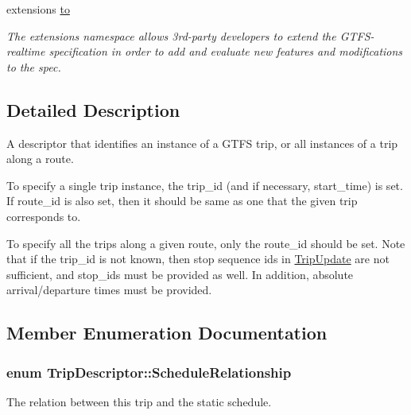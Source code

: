 \begin{DoxyCompactItemize}
\item 
extensions \hyperlink{structTripDescriptor_a1c2d7a6af17cb6ebf909b087bc2af535}{to}
\begin{DoxyCompactList}\small\item\em The extensions namespace allows 3rd-\/party developers to extend the G\+T\+F\+S-\/realtime specification in order to add and evaluate new features and modifications to the spec. \end{DoxyCompactList}\end{DoxyCompactItemize}


\subsection{Detailed Description}
A descriptor that identifies an instance of a G\+T\+FS trip, or all instances of a trip along a route. 


\begin{DoxyItemize}
\item To specify a single trip instance, the trip\+\_\+id (and if necessary, start\+\_\+time) is set. If route\+\_\+id is also set, then it should be same as one that the given trip corresponds to.
\item To specify all the trips along a given route, only the route\+\_\+id should be set. Note that if the trip\+\_\+id is not known, then stop sequence ids in \hyperlink{structTripUpdate}{Trip\+Update} are not sufficient, and stop\+\_\+ids must be provided as well. In addition, absolute arrival/departure times must be provided. 
\end{DoxyItemize}

\subsection{Member Enumeration Documentation}
\subsubsection[{\texorpdfstring{Schedule\+Relationship}{ScheduleRelationship}}]{\setlength{\rightskip}{0pt plus 5cm}enum {\bf Trip\+Descriptor\+::\+Schedule\+Relationship}}\hypertarget{structTripDescriptor_a3edbca669de2c1c3350403537b24a26e}{}\label{structTripDescriptor_a3edbca669de2c1c3350403537b24a26e}


The relation between this trip and the static schedule. 

